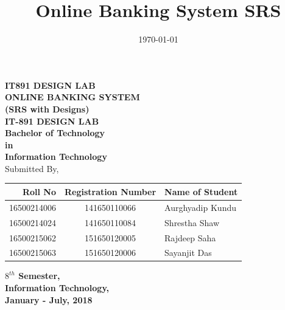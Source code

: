 \documentclass[11pt, a4paper]{thesis}
\date{\today}
\title{Online Banking System SRS}
\begin{document}
\begin{titlepage}

\begin{center}

\textup{\small {\bf IT891 DESIGN LAB}}\\[0.2in]

\Large \textbf {ONLINE BANKING SYSTEM \\ (SRS with Designs)}\\[0.5in]
       {\large \bf{IT-891 DESIGN LAB}}\\[0.1in]
       {\bf Bachelor of Technology \\in\\ Information Technology}\\[0.5in]

Submitted By,\\
\begin{table}[h]
\centering
\begin{tabular}{ r  c  l }
\toprule
\textbf{Roll No} & \textbf{Registration Number} & \textbf{Name of Student} \\ \midrule
16500214006 & 141650110066 & Aurghyadip Kundu \\
16500214024 & 141650110084  & Shrestha Shaw \\
16500215062 & 151650120005  & Rajdeep Saha \\
16500215063 & 151650120006  & Sayanjit Das\\
\bottomrule
\end{tabular}
\end{table}
\vspace{.1in}
\textbf{$8^{th}$ Semester,\\
Information Technology,\\
January  - July, 2018}\\


\end{center}
\end{titlepage}
\end{document}
